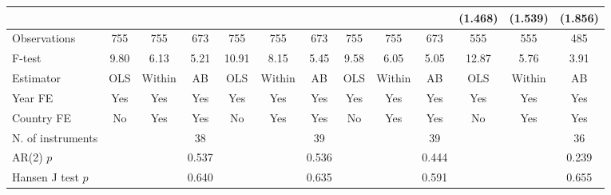\begin{longtable}{m{5cm}*{12}{c}}
                    &               &               &               &               &               &               &               &               &               &     (1.468)   &     (1.539)   &     (1.856)   \\
\midrule
Observations        &         755   &         755   &         673   &         755   &         755   &         673   &         755   &         755   &         673   &         555   &         555   &         485   \\
F-test              &        9.80   &        6.13   &        5.21   &       10.91   &        8.15   &        5.45   &        9.58   &        6.05   &        5.05   &       12.87   &        5.76   &        3.91   \\
Estimator           &         OLS   &      Within   &          AB   &         OLS   &      Within   &          AB   &         OLS   &      Within   &          AB   &         OLS   &      Within   &          AB   \\
Year FE             &         Yes   &         Yes   &         Yes   &         Yes   &         Yes   &         Yes   &         Yes   &         Yes   &         Yes   &         Yes   &         Yes   &         Yes   \\
Country FE          &          No   &         Yes   &         Yes   &          No   &         Yes   &         Yes   &          No   &         Yes   &         Yes   &          No   &         Yes   &         Yes   \\
N. of instruments   &               &               &          38   &               &               &          39   &               &               &          39   &               &               &          36   \\
AR(2) \(p\)         &               &               &       0.537   &               &               &       0.536   &               &               &       0.444   &               &               &       0.239   \\
Hansen J test \(p\) &               &               &       0.640   &               &               &       0.635   &               &               &       0.591   &               &               &       0.655   \\

\end{longtable}
